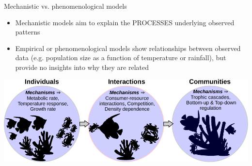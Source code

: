 \documentclass[xcolor=x11names,handout,compress]{beamer}
\renewcommand{\(}{\begin{columns}}
\renewcommand{\)}{\end{columns}}
\newcommand{\<}[1]{\begin{column}{#1}}
\renewcommand{\>}{\end{column}}
\begin{document}
\begin{frame}{Mechanistic vs. phenomenological models}

   \begin{itemize}\itemsep4pt
		 \item Mechanistic models aim to explain the PROCESSES underlying 
		 observed patterns

		\item Empirical or phenomenological models show relationships 
		between observed data (e.g. population size as a function of 
		temperature or rainfall), but provide no insights into why they are 
		related
	 \end{itemize}

\pause
	
 \begin{center}
	 \includegraphics[width=\textwidth]{Mechanisms.pdf}
 \end{center} 

\end{frame}
\end{document}
